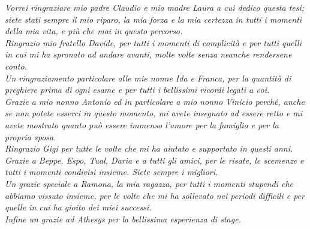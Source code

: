 \documentclass[12pt,a4paper,twoside,openany,english]{book}
\begin{document}
\textit{Vorrei ringraziare mio padre Claudio e mia madre Laura a cui dedico questa tesi; siete stati sempre il mio riparo, la mia forza e la mia certezza in tutti i momenti della mia vita, e più che mai in questo percorso.\\
Ringrazio mio fratello Davide, per tutti i momenti di complicità e per tutti quelli in cui mi ha spronato ad andare avanti, molte volte senza neanche rendersene conto.\\
Un ringraziamento particolare alle mie nonne Ida e Franca, per la quantità di preghiere prima di ogni esame e per tutti i bellissimi ricordi legati a voi.\\
Grazie a mio nonno Antonio ed in particolare a mio nonno Vinicio perché, anche se non potete esserci in questo momento, mi avete insegnato ad essere retto e mi avete mostrato quanto può essere immenso l'amore per la famiglia e per la propria sposa.\\
Ringrazio Gigi per tutte le volte che mi ha aiutato e supportato in questi anni.\\
Grazie a Beppe, Espo, Tual, Daria e a tutti gli amici, per le risate, le scemenze e tutti i momenti condivisi insieme. Siete sempre i migliori.\\
Un grazie speciale a Ramona, la mia ragazza, per tutti i momenti stupendi che abbiamo vissuto insieme, per le volte che mi ha sollevato nei periodi difficili e per quelle in cui ha gioito dei miei successi.\\
Infine un grazie ad Athesys per la bellissima esperienza di stage.}

\cleardoublepage
%
\printglossary
\printglossary[type=\acronymtype,title=Acronimi]
\nocite{*}
\printbibliography


\end{document}
